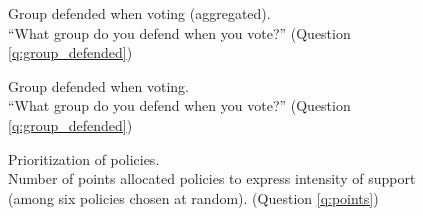 \documentclass[12pt,english]{article}
\begin{document}
\begin{figure}[h!]
    \caption[Group defended when voting (aggregated)]{Group defended when voting (aggregated). \\ ``What group do you defend when you vote?'' (Question \ref{q:group_defended})}\label{fig:group_defended}
\end{figure}

\begin{figure}[h!]
    \caption[Group defended when voting]{Group defended when voting. \\ ``What group do you defend when you vote?'' (Question \ref{q:group_defended})}\label{fig:group_defended}
\end{figure}

\begin{figure}[h!] %
    \caption[Prioritization of policies]{Prioritization of policies. \\Number of points allocated policies to express intensity of support (among six policies chosen at random). (Question \ref{q:points})}\label{fig:points}
\end{figure}
\end{document}
